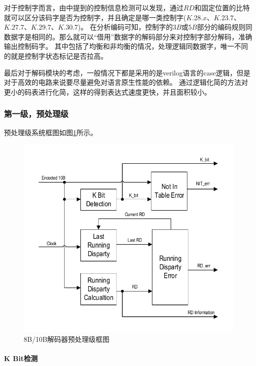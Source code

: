 \documentclass[UTF8]{ctexart}
\begin{document}
对于控制字而言，由\cite{Actel1998}中提到的控制信息检测可以发现，通过$RD$和固定位置的比特就可以区分该码字是否为控制字，并且确定是哪一类控制字($K.28.x$、$K.23.7$、$K.27.7$、$K.29.7$、$K.30.7$)。
在分析编码可知，控制字的$3B$或$5B$部分的编码规则同数据字是相同的。那么就可以“借用”数据字的解码部分来对控制字部分解码，准确输出控制码字。
其中包括了均衡和非均衡的情况，处理逻辑同数据字，唯一不同的就是控制字状态标记是否拉高。

最后对于解码模块的考虑，一般情况下都是采用的是verilog语言的case逻辑，但是对于高效的电路来说要尽量避免对语言原生性能的依赖。
通过逻辑化简的方法对更小的码表进行化简，这样的得到表达式速度更快，并且面积较小。

\subsubsection{第一级，预处理级}

预处理级系统框图如图\ref{fig:8b10b_preprocess_model}所示。

\begin{figure}[H]
\centering
\includegraphics[width=14cm]{./img/8b10b_preprocess_model.pdf}
\caption{8B/10B解码器预处理级框图}
\label{fig:8b10b_preprocess_model}
\end{figure}

\paragraph{K Bit检测}
\end{document}
